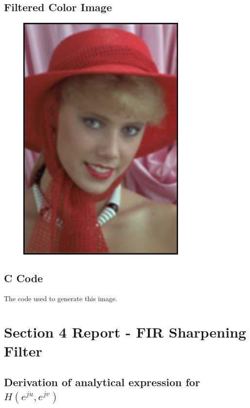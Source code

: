 \documentclass{article}
\begin{document}
\subsection{Filtered Color Image}
\begin{figure}[H]
    \centering
    \includegraphics[width=0.75\textwidth]{../results/smoothed.png}
    \begin{center}
    \end{center}
\end{figure}
\subsection{C Code}
The code used to generate this image.


\section{Section 4 Report - FIR Sharpening Filter}
\subsection{Derivation of analytical expression for $H(e^{ju}, e^{jv})$}
\end{document}
